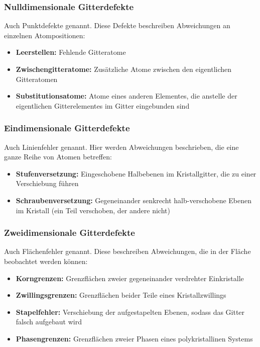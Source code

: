\documentclass[german, %
parskip=full, %
bibliography=totoc, %
]{scrartcl}
\begin{document}
\subsubsection{Nulldimensionale Gitterdefekte}

Auch Punktdefekte genannt. Diese Defekte beschreiben Abweichungen an einzelnen Atompositionen:
\begin{itemize}
\item \textbf{Leerstellen:} Fehlende Gitteratome
\item \textbf{Zwischengitteratome:} Zusätzliche Atome zwischen den eigentlichen Gitteratomen
\item \textbf{Substitutionsatome:} Atome eines anderen Elementes, die anstelle der eigentlichen Gitterelementes im Gitter eingebunden sind
\end{itemize}

\subsubsection{Eindimensionale Gitterdefekte}

Auch Linienfehler genannt. Hier werden Abweichungen beschrieben, die eine ganze Reihe von Atomen betreffen:
\begin{itemize}
\item \textbf{Stufenversetzung:} Eingeschobene Halbebenen im Kristallgitter, die zu einer Verschiebung führen
\item \textbf{Schraubenversetzung:} Gegeneinander senkrecht halb-verschobene Ebenen im Kristall (ein Teil verschoben, der andere nicht)
\end{itemize}

\subsubsection{Zweidimensionale Gitterdefekte}

Auch Flächenfehler genannt. Diese beschreiben Abweichungen, die in der Fläche beobachtet werden können:
\begin{itemize}
\item \textbf{Korngrenzen:} Grenzflächen zweier gegeneinander verdrehter Einkristalle
\item \textbf{Zwillingsgrenzen:} Grenzflächen beider Teile eines Kristallzwillings
\item \textbf{Stapelfehler:} Verschiebung der aufgestapelten Ebenen, sodass das Gitter falsch aufgebaut wird
\item \textbf{Phasengrenzen:} Grenzflächen zweier Phasen eines polykristallinen Systems
\end{itemize}
\end{document}
